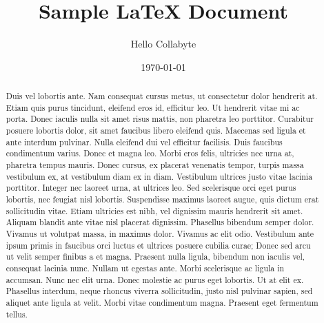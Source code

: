 \documentclass[12pt, a4paper]{report}
\title{Sample LaTeX Document}
\author{Hello Collabyte}
\date{\today}
\begin{document}
\maketitle
\begin{abstract}
Duis vel lobortis ante. Nam consequat cursus metus, ut consectetur dolor hendrerit at. Etiam quis purus tincidunt, eleifend eros id, efficitur leo. Ut hendrerit vitae mi ac porta. Donec iaculis nulla sit amet risus mattis, non pharetra leo porttitor. Curabitur posuere lobortis dolor, sit amet faucibus libero eleifend quis. Maecenas sed ligula et ante interdum pulvinar. Nulla eleifend dui vel efficitur facilisis. Duis faucibus condimentum varius. Donec et magna leo. Morbi eros felis, ultricies nec urna at, pharetra tempus mauris. Donec cursus, ex placerat venenatis tempor, turpis massa vestibulum ex, at vestibulum diam ex in diam. Vestibulum ultrices justo vitae lacinia porttitor. Integer nec laoreet urna, at ultrices leo. Sed scelerisque orci eget purus lobortis, nec feugiat nisl lobortis. Suspendisse maximus laoreet augue, quis dictum erat sollicitudin vitae.  Etiam ultricies est nibh, vel dignissim mauris hendrerit sit amet. Aliquam blandit ante vitae nisl placerat dignissim. Phasellus bibendum semper dolor. Vivamus ut volutpat massa, in maximus dolor. Vivamus ac elit odio. Vestibulum ante ipsum primis in faucibus orci luctus et ultrices posuere cubilia curae; Donec sed arcu ut velit semper finibus a et magna. Praesent nulla ligula, bibendum non iaculis vel, consequat lacinia nunc. Nullam ut egestas ante. Morbi scelerisque ac ligula in accumsan. Nunc nec elit urna. Donec molestie ac purus eget lobortis. Ut at elit ex. Phasellus interdum, neque rhoncus viverra sollicitudin, justo nisl pulvinar sapien, sed aliquet ante ligula at velit. Morbi vitae condimentum magna. Praesent eget fermentum tellus.   
\end{abstract}

\tableofcontents
\listoffigures
\listoftables







\end{document}
